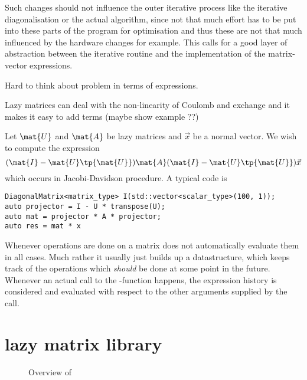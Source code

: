 Such changes should not influence the outer iterative process
like the iterative diagonalisation or the actual \SCF algorithm,
since not that much effort has to be put into these parts
of the program for optimisation
and thus these are not that much influenced by the hardware changes for example.
This calls for a good layer of abstraction between the
iterative routine and the implementation of the matrix-vector \contraction expressions.

Hard to think about problem in terms of expressions.



Lazy matrices can deal with the non-linearity of Coulomb and exchange
and it makes it easy to add terms (maybe show example ??)

Let $\mat{U}$ and $\mat{A}$ be lazy matrices and $\vec{x}$ be a normal vector.
We wish to compute the expression
\[ (\mat{I} - \mat{U} \tp{\mat{U}}) \mat{A} (\mat{I} - \mat{U} \tp{\mat{U}}) \vec{x} \]
which occurs in Jacobi-Davidson procedure.
A typical code is
\begin{lstlisting}
DiagonalMatrix<matrix_type> I(std::vector<scalar_type>(100, 1));
auto projector = I - U * transpose(U);
auto mat = projector * A * projector;
auto res = mat * x
\end{lstlisting}





Whenever operations are done on a matrix \lazyten does not automatically
evaluate them in all cases.
Much rather it usually just builds up a datastructure,
which keeps track of the operations which \textit{should} be done
at some point in the future.
Whenever an actual call to the \contraction-function happens,
the expression history is considered and evaluated with respect
to the other arguments supplied by the \contraction call.




\section{\lazyten lazy matrix library}

\begin{figure}
	\centering
	\caption{Overview of \lazyten}
	\label{fig:structureLazyten}
\end{figure}





